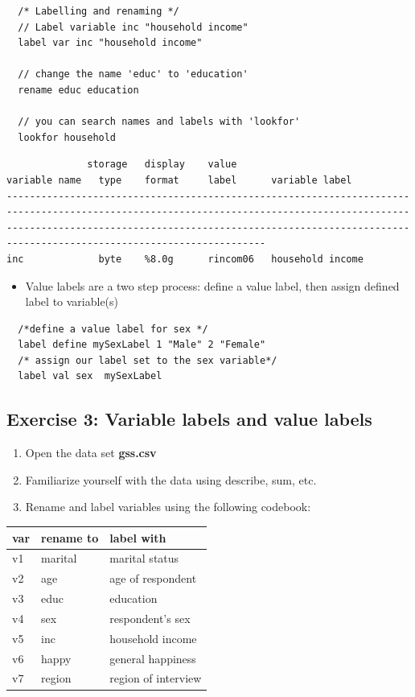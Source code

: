 \documentclass[]{book}
\providecommand{\tightlist}{%
  \setlength{\itemsep}{0pt}\setlength{\parskip}{0pt}}
\begin{document}
\begin{verbatim}
  /* Labelling and renaming */
  // Label variable inc "household income"
  label var inc "household income"

  // change the name 'educ' to 'education'
  rename educ education

  // you can search names and labels with 'lookfor' 
  lookfor household
\end{verbatim}

\begin{verbatim}
              storage   display    value
variable name   type    format     label      variable label
---------------------------------------------------------------------------------------------------------------------------------------------------------------------------------------------------------------------------------------------------------------
inc             byte    %8.0g      rincom06   household income
\end{verbatim}

\begin{itemize}
\tightlist
\item
  Value labels are a two step process: define a value label, then assign
  defined label to variable(s)
\end{itemize}

\begin{verbatim}
  /*define a value label for sex */
  label define mySexLabel 1 "Male" 2 "Female"
  /* assign our label set to the sex variable*/
  label val sex  mySexLabel
\end{verbatim}

\subsection{Exercise 3: Variable labels and value
labels}\label{exercise-3-variable-labels-and-value-labels}

\begin{enumerate}
\def\labelenumi{\arabic{enumi}.}
\tightlist
\item
  Open the data set \textbf{gss.csv}
\item
  Familiarize yourself with the data using describe, sum, etc.
\item
  Rename and label variables using the following codebook:
\end{enumerate}

\begin{longtable}[]{@{}lll@{}}
\toprule
\textbf{var} & \textbf{rename to} & \textbf{label with}\tabularnewline
\midrule
\endhead
v1 & marital & marital status\tabularnewline
v2 & age & age of respondent\tabularnewline
v3 & educ & education\tabularnewline
v4 & sex & respondent's sex\tabularnewline
v5 & inc & household income\tabularnewline
v6 & happy & general happiness\tabularnewline
v7 & region & region of interview\tabularnewline
\bottomrule
\end{longtable}
\end{document}

